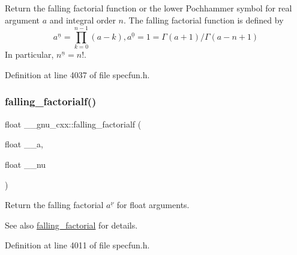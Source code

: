 Return the falling factorial function or the lower Pochhammer symbol for real argument $ a $ and integral order $ n $. The falling factorial function is defined by \[ a^{\underline{n}} = \prod_{k=0}^{n-1} (a - k), a^{\underline{0}} = 1 = \Gamma(a + 1) / \Gamma(a - n + 1) \] In particular, $ n^{\underline{n}} = n! $. 



Definition at line 4037 of file specfun.\+h.

\mbox{\label{group__gnu__math__spec__func_gaf32abbc790bfa870725728e5470de532}} 
\subsubsection{\texorpdfstring{falling\+\_\+factorialf()}{falling\_factorialf()}}
{\footnotesize\ttfamily float \+\_\+\+\_\+gnu\+\_\+cxx\+::falling\+\_\+factorialf (\begin{DoxyParamCaption}\item[{float}]{\+\_\+\+\_\+a,  }\item[{float}]{\+\_\+\+\_\+nu }\end{DoxyParamCaption})\hspace{0.3cm}{\ttfamily [inline]}}

Return the falling factorial $ a^{\underline{\nu}} $ for float arguments.

\begin{DoxySeeAlso}{See also}
\hyperlink{group__gnu__math__spec__func_ga3cc8eb6068c7155ec48b40e20160c5c0}{falling\+\_\+factorial} for details. 
\end{DoxySeeAlso}


Definition at line 4011 of file specfun.\+h.

\mbox{\label{group__gnu__math__spec__func_gab816c3bcbe00595881799ce969475085}} 
